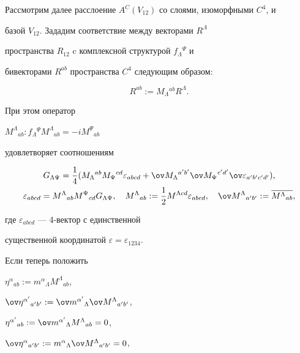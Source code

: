 Рассмотрим далее расслоение $A^C(V_{12})$ со слоями, изоморфными $C^4$, и


базой $V_{12}$. Зададим соответствие между векторами $R^\Lambda$


пространства $R_{12}$ c комплексной структурой $f_\Lambda{}^\Psi$ и


бивекторами $R^{ab}$ пространства $C^4$ следующим образом:


$$


\label{e14s}


R^{ab}:=M_\Lambda{}^{ab}R^\Lambda.


$$


При этом оператор


$M^\Lambda{}_{ab}: f_\Lambda{}^\Psi M^\Lambda{}_{ab}=-iM^\Psi{}_{ab}$


\cite{Neif2} удовлетворяет соотношениям


\begin{gather*}


G_{\Lambda\Psi}=\frac{1}{4}


(M_\Lambda{}^{ab}M_\Psi{}^{cd}\varepsilon_{abcd}+


\ov M_\Lambda{}^{a'b'}\ov M_\Psi{}^{c'd'}\ov\varepsilon_{a'b'c'd'}),\\


%


\varepsilon_{abcd} = M^\Lambda{}_{ab} M^\Psi{}_{cd}


G_{\Lambda\Psi},\quad M^\Lambda{}_{ab}:=\frac{1}{2}M^{\Lambda cd}


\varepsilon_{abcd},\quad \ov M^\Lambda{}_{a'b'}:=


\overline{M^\Lambda{}_{ab}},


\end{gather*}


где $\varepsilon_{abcd}$ --- 4-вектор с единственной


существенной координатой $\varepsilon=\varepsilon_{1234}$.


Если теперь положить


$\eta^\alpha{}_{ab}:=m^\alpha{}_\Lambda M^\Lambda{}_{ab}$,


$\ov \eta^{\alpha '}{}_{a'b'}:=


\ov m^{\alpha '}{}_\Lambda \ov M^\Lambda{}_{a'b'}$,


$\eta^{\alpha '}{}_{ab}:=\ov m^{\alpha '}{}_\Lambda M^\Lambda{}_{ab}=0$,


$\ov \eta^\alpha {}_{a'b'}:=


m^\alpha{}_\Lambda \ov M^\Lambda{}_{a'b'}=0$,


